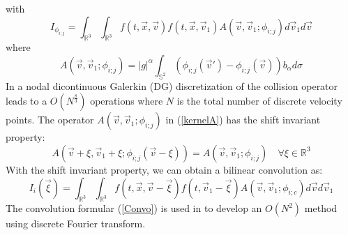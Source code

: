 \documentclass{article}
\begin{document}
with 
\begin{equation} \label{directColl}
I_{\phi_{i;j}} = \int_{\mathbb{R}^3}\int_{\mathbb{R}^3}f(t,\vec{x},\vec{v})f(t,\vec{x},\vec{v}_1)A(\vec{v},\vec{v}_1;\phi_{i;j})d\vec{v}_1d\vec{v}
\end{equation}
where
\begin{equation} \label{kernelA}
	A(\vec{v},\vec{v}_1;\phi_{i;j}) = |g|^\alpha\int_{\mathbb{S}^2}(\phi_{i;j}(\vec{v}') - \phi_{i;j}(\vec{v}))b_\alpha d\sigma
\end{equation}
In \cite{Alekseenko1,Alekseenko2} a nodal dicontinuous Galerkin (DG) discretization of the collision operator leads to a $O(N^{\frac{8}{3}})$ operations where $N$ is the total number of discrete velocity points.
The operator $A(\vec{v},\vec{v}_1;\phi_{i;j})$ in (\ref{kernelA}) has the shift invariant property:
\begin{equation}
A(\vec{v}+\xi,\vec{v}_1+\xi;\phi_{i;j}(\vec{v}-\xi)) = A(\vec{v},\vec{v}_1;\phi_{i;j}) \quad \forall\xi \in \mathbb{R}^3
\end{equation}
With the shift invariant property, we can obtain a bilinear convolution as:
\begin{equation} \label{Convo}
I_i(\vec{\xi}) = \int_{\mathbb{R}^3}\int_{\mathbb{R}^3}f(t,\vec{x},\vec{v} - \vec{\xi})f(t,\vec{v}_1 - \vec{\xi})A(\vec{v},\vec{v}_1;\phi_{i;c})d\vec{v}d\vec{v}_1
\end{equation}
The convolution formular (\ref{Convo}) is used in \cite{Alekseenko4} to develop an $O(N^2)$ method using discrete Fourier transform.
\end{document}
